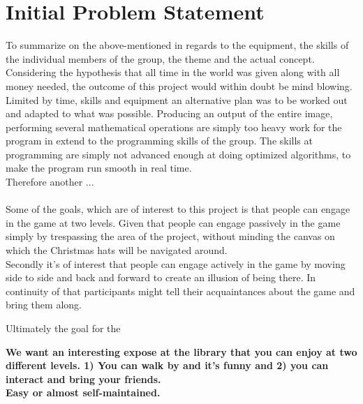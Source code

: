\section{Initial Problem Statement}
To summarize on the above-mentioned in regards to the equipment, the skills of the individual members of the group, the theme and the actual concept.\\
Considering the hypothesis that all time in the world was given along with all money needed, the outcome of this project would within doubt be mind blowing. Limited by time, skills and equipment an alternative plan was to be worked out and adapted to what was possible. Producing an output of the entire image, performing several mathematical operations are simply too heavy work for the program in extend to the programming skills of the group. The skills at programming are simply not advanced enough at doing optimized algorithms, to make the program run smooth in real time. \\
Therefore another ...\\
\\
Some of the goals, which are of interest to this project is that people can engage in the game at two levels. Given that people can engage passively in the game simply by trespassing the area of the project, without minding the canvas on which the Christmas hats will be navigated around.\\
Secondly it's of interest that people can engage actively in the game by moving side to side and back and forward to create an illusion of being there. In continuity of that participants might tell their acquaintances about the game and bring them along.

Ultimately the goal for the  

      
\textbf{We want an interesting expose at the library that you can enjoy at two different levels. 1) You can walk by and it's funny and 2) you can interact and bring your friends.}\\
\textbf{Easy or almost self-maintained.}











